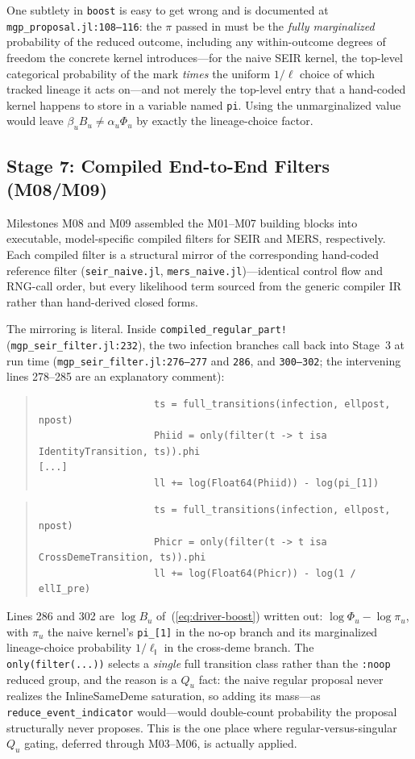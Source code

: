 \documentclass[11pt,leqno]{article}
\newcommand{\code}[1]{\texttt{#1}}
\newcommand{\deme}[1]{\mathsf{#1}}
\theoremstyle{plain}
\theoremstyle{definition}
\begin{document}
One subtlety in \code{boost} is easy to get wrong and is documented at
\code{mgp\_proposal.jl:108--116}: the $\pi$ passed in must be the
\emph{fully marginalized} probability of the reduced outcome, including any
within-outcome degrees of freedom the concrete kernel introduces---for the
naive SEIR kernel, the top-level categorical probability of the mark
\emph{times} the uniform $1/\ell$ choice of which tracked lineage it acts
on---and not merely the top-level entry that a hand-coded kernel happens to
store in a variable named \code{pi}.  Using the unmarginalized value would
leave $\beta_u B_u \ne \alpha_u \Phi_u$ by exactly the lineage-choice factor.

\subsection{Stage 7: Compiled End-to-End Filters (M08/M09)}

Milestones M08 and M09 assembled the M01--M07 building blocks into
executable, model-specific compiled filters for SEIR and MERS,
respectively.  Each compiled filter is a structural mirror of the
corresponding hand-coded reference filter (\code{seir\_naive.jl},
\code{mers\_naive.jl})---identical control flow and RNG-call order, but
every likelihood term sourced from the generic compiler IR rather than
hand-derived closed forms.

The mirroring is literal.  Inside
\code{compiled\_regular\_part!} (\code{mgp\_seir\_filter.jl:232}), the two
infection branches call back into Stage~3 at run time
(\code{mgp\_seir\_filter.jl:276--277} and \code{286}, and \code{300--302};
the intervening lines 278--285 are an explanatory comment):
\begin{quote}
{\small
\begin{verbatim}
                    ts = full_transitions(infection, ellpost, npost)
                    Phiid = only(filter(t -> t isa IdentityTransition, ts)).phi
[...]
                    ll += log(Float64(Phiid)) - log(pi_[1])
\end{verbatim}
}
\end{quote}
\begin{quote}
{\small
\begin{verbatim}
                    ts = full_transitions(infection, ellpost, npost)
                    Phicr = only(filter(t -> t isa CrossDemeTransition, ts)).phi
                    ll += log(Float64(Phicr)) - log(1 / ellI_pre)
\end{verbatim}
}
\end{quote}
Lines 286 and 302 are $\log B_u$ of~(\ref{eq:driver-boost}) written out:
$\log \Phi_u - \log \pi_u$, with $\pi_u$ the naive kernel's
\code{pi\_[1]} in the no-op branch and its marginalized lineage-choice
probability $1/\ell_{\deme{I}}$ in the cross-deme branch.  The
\code{only(filter(...))} selects a \emph{single} full transition class rather
than the \code{:noop} reduced group, and the reason is a $Q_u$ fact:
the naive regular proposal never realizes the InlineSameDeme saturation, so
adding its mass---as \code{reduce\_event\_indicator} would---would
double-count probability the proposal structurally never proposes.  This is
the one place where regular-versus-singular $Q_u$ gating, deferred through
M03--M06, is actually applied.
\end{document}
